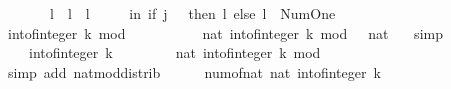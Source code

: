 \begin{isabellebody}
\ \ \ \ \ \ \ l{\isacharprime}{\kern0pt}{\isacharprime}{\kern0pt}\ {\isacharequal}{\kern0pt}\ l{\isacharprime}{\kern0pt}\ {\isacharplus}{\kern0pt}\ l{\isacharprime}{\kern0pt}\isanewline
\ \ \ \ \ in\ if\ j\ {\isacharequal}{\kern0pt}\ {}\ then\ l{\isacharprime}{\kern0pt}{\isacharprime}{\kern0pt}\ else\ l{\isacharprime}{\kern0pt}{\isacharprime}{\kern0pt}\ {\isacharplus}{\kern0pt}\ Num{\isachardot}{\kern0pt}One{\isacharparenright}{\kern0pt}{\isachardoublequoteclose}\isanewline
%
\isadelimproof
%
\endisadelimproof
%
\isatagproof
{}\isamarkupfalse%
\ {\isacharminus}{\kern0pt}\isanewline
\ \ \isacommand{{\isacharbraceleft}{\kern0pt}}\isamarkupfalse%
\isanewline
\ \ \ \ \isamarkupfalse%
\ {\isachardoublequoteopen}int{\isacharunderscore}{\kern0pt}of{\isacharunderscore}{\kern0pt}integer\ k\ mod\ {}\ {\isacharequal}{\kern0pt}\ {}{\isachardoublequoteclose}\isanewline
\ \ \ \ \isamarkupfalse%
\ \isamarkupfalse%
\ {\isachardoublequoteopen}nat\ {\isacharparenleft}{\kern0pt}int{\isacharunderscore}{\kern0pt}of{\isacharunderscore}{\kern0pt}integer\ k\ mod\ {}{\isacharparenright}{\kern0pt}\ {\isacharequal}{\kern0pt}\ nat\ {}{\isachardoublequoteclose}\ \isamarkupfalse%
\ simp\isanewline
\ \ \ \ \isamarkupfalse%
\ \isamarkupfalse%
\ {\isacharasterisk}{\kern0pt}{\isacharcolon}{\kern0pt}\ {\isachardoublequoteopen}{}\ {\isacharless}{\kern0pt}\ int{\isacharunderscore}{\kern0pt}of{\isacharunderscore}{\kern0pt}integer\ k{\isachardoublequoteclose}\isanewline
\ \ \ \ \isamarkupfalse%
\ \isamarkupfalse%
\ {\isacharasterisk}{\kern0pt}{\isacharasterisk}{\kern0pt}{\isacharcolon}{\kern0pt}\ {\isachardoublequoteopen}nat\ {\isacharparenleft}{\kern0pt}int{\isacharunderscore}{\kern0pt}of{\isacharunderscore}{\kern0pt}integer\ k{\isacharparenright}{\kern0pt}\ mod\ {}\ {\isacharequal}{\kern0pt}\ {}{\isachardoublequoteclose}\ \isamarkupfalse%
\ {\isacharparenleft}{\kern0pt}simp\ add{\isacharcolon}{\kern0pt}\ nat{\isacharunderscore}{\kern0pt}mod{\isacharunderscore}{\kern0pt}distrib{\isacharparenright}{\kern0pt}\isanewline
\ \ \ \ \isamarkupfalse%
\ {\isachardoublequoteopen}num{\isacharunderscore}{\kern0pt}of{\isacharunderscore}{\kern0pt}nat\ {\isacharparenleft}{\kern0pt}nat\ {\isacharparenleft}{\kern0pt}int{\isacharunderscore}{\kern0pt}of{\isacharunderscore}{\kern0pt}integer\ k{\isacharparenright}{\kern0pt}{\isacharparenright}{\kern0pt}\ {\isacharequal}{\kern0pt}\isanewline

\end{isabellebody}
